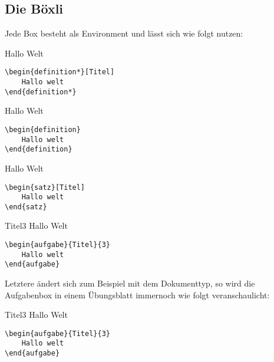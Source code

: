 \subsection[Wie funktionieren Boxen]{Die Böxli}
Jede Box besteht als Environment und lässt sich wie folgt nutzen:
\begin{multicols}{2}
\begin{definition*}[Titel]
    Hallo Welt
\begin{lstlisting}[language=lLatex]
\begin{definition*}[Titel]
    Hallo welt
\end{definition*}\end{lstlisting}
\end{definition*}

\begin{definition}
    Hallo Welt
\begin{lstlisting}[language=lLatex]
\begin{definition}
    Hallo welt
\end{definition}\end{lstlisting}
\end{definition}

\begin{satz}[Titel]
    Hallo Welt
\begin{lstlisting}[language=lLatex]
\begin{satz}[Titel]
    Hallo welt
\end{satz}\end{lstlisting}
\end{satz}
\begin{aufgabe}{Titel}{3}
    Hallo Welt
\begin{lstlisting}[language=lLatex]
\begin{aufgabe}{Titel}{3}
    Hallo welt
\end{aufgabe}\end{lstlisting}
\end{aufgabe}
\end{multicols}
Letztere ändert sich zum Beispiel mit dem Dokumenttyp, so wird die Aufgabenbox in einem Übungsblatt immernoch wie folgt veranschaulicht:
\begin{aufgabe}{Titel}{3}
    Hallo Welt
\begin{lstlisting}[language=lLatex]
\begin{aufgabe}{Titel}{3}
    Hallo welt
\end{aufgabe}\end{lstlisting}
\end{aufgabe}
